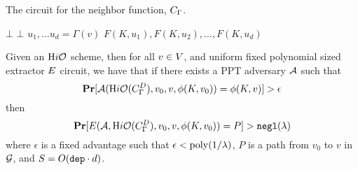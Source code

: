 \begin{algorithm}[H]
	\caption{
		The circuit for the neighbor function, $C_\Gamma$.
	}
	\begin{algorithmic}[1]
				\State \Return $\bot$
			\EndIf
				\State \Return $\bot$
			\EndIf
			\State $u_1, \dots u_d = \Gamma(v)$
			\State \Return $F(K, u_1), F(K, u_2), \dots, F(K, u_d)$
		\EndFunction
	\end{algorithmic}
	\label{alg:neighb}
\end{algorithm}

\begin{theorem}
	\label{thm:labelExtract}
	Given an $\text{H}i\mathcal{O}$ scheme, then
	for all $v \in V$, and uniform fixed polynomial sized extractor $E$ circuit, we have that if there
	exists a PPT adversary $\mathcal{A}$ such that
	\begin{equation}
		\operatorname*{\mathbf{Pr}}[\mathcal{A}(\text{H}i\mathcal{O}({C_\Gamma^D}), v_0, v, \phi(K, v_0)) = \phi(K, v)] > \epsilon		
	\end{equation}	
	then
	\begin{equation}
		\operatorname*{\mathbf{Pr}}[E(\mathcal{A}, \text{H}i\mathcal{O}({C_\Gamma^D}), v_0, v, \phi(K, v_0)) = P] > \texttt{negl}(\lambda)
	\end{equation}
	where $\epsilon$ is a fixed advantage such that $\epsilon < \operatorname{poly}(1 / \lambda)$,
	$P$ is a path from $v_0$ to $v$ in $\mathcal{G}$, 
	and $S = O(\texttt{dep} \cdot d)$.
\end{theorem}